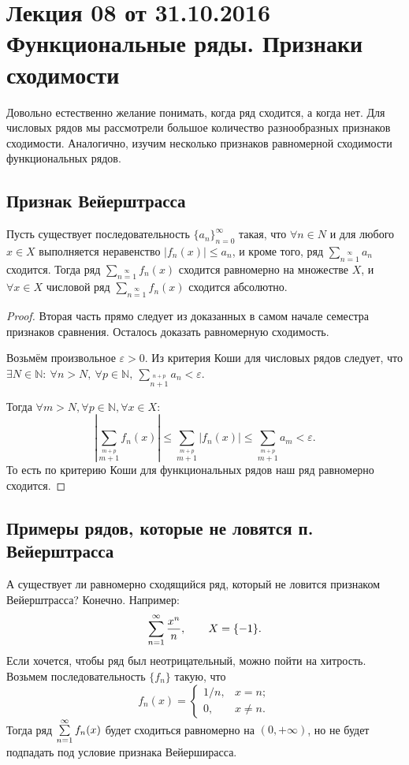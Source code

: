 \section{Лекция 08 от 31.10.2016 \\ Функциональные ряды. Признаки сходимости}
	
	Довольно естественно желание понимать, когда ряд сходится, а когда нет. Для числовых рядов мы рассмотрели большое количество разнообразных признаков сходимости. Аналогично, изучим несколько признаков равномерной сходимости функциональных рядов.
	
	\subsection{Признак Вейерштрасса}
	
	\begin{Test}
		
		Пусть существует последовательность $\{a_n\}_{n=0}^\infty$ такая, что $\forall n \in N$ и для любого $x\in X$ выполняется неравенство $|f_n(x)|\leq a_n$, и кроме того, ряд $\sum_{n=1}\limits^{\infty}a_n$ сходится. Тогда ряд $\sum_{n=1}\limits^{\infty}f_n(x)$ сходится равномерно на множестве $X$, и $\forall x \in X$ числовой ряд $\sum_{n=1}\limits^{\infty}f_n(x)$ сходится абсолютно.
	\end{Test}
	
	\begin{proof}
		Вторая часть прямо следует из доказанных в самом начале семестра признаков сравнения. Осталось доказать равномерную сходимость.
		
		Возьмём произвольное $\varepsilon>0$. Из критерия Коши для числовых рядов следует, что $\exists N\in \mathbb{N}: \ \forall n>N, \ \forall p\in \mathbb{N}, \ \sum_{n+1}\limits^{n+p}a_n < \varepsilon$.
		
		Тогда $\forall m>N, \forall p\in \mathbb{N}, \forall x \in X:$
		\[
		\left| \sum_{m+1}\limits^{m+p}f_n(x)\right|  \leq \sum_{m+1}\limits^{m+p} |f_n(x)| \leq  \sum_{m+1}\limits^{m+p}a_m < \varepsilon.
		\]
		То есть по критерию Коши для функциональных рядов наш ряд равномерно сходится.
	\end{proof}
	
	\subsection{Примеры рядов, которые не ловятся п. Вейерштрасса}
	
	А существует ли равномерно сходящийся ряд, который не ловится признаком Вейерштрасса? Конечно. Например:
	$$
	\sum\limits_{n=1}^{\infty} \frac{x^n}{n}, \qquad X = \{-1\}.
	$$
	Если хочется, чтобы ряд был неотрицательный, можно пойти на хитрость. Возьмем последовательность $\{f_n\}$ такую, что
	$$
	f_n(x) = \begin{cases}
	1/n, & x = n; \\
	0, & x \neq n.
	\end{cases}
	$$
	Тогда ряд $\sum\limits_{n=1}^{\infty} f_n(x)$ будет сходиться равномерно на $(0, +\infty)$, но не будет подпадать под условие признака Вейерширасса.
	

